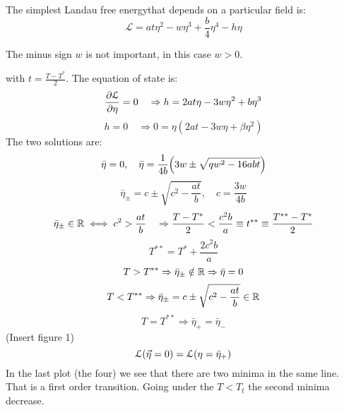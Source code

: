 \documentclass[../main/main.tex]{subfiles}
\begin{document}
The simplest Landau free energythat depends on a particular field is:
\begin{equation}
  \mathcal{L} = a t \eta ^2 - w \eta ^3 + \frac{b}{4} \eta ^4 - h \eta
\end{equation}
\begin{remark}
The minus sign \( w \) is not important, in this case \( w>0 \).
\end{remark}
with \( t = \frac{T-T^*}{2} \).
The equation of state is:
\begin{equation}
  \pdv{\mathcal{L}}{\eta } = 0 \quad \Rightarrow h = 2 a t \eta - 3 w \eta ^2 + b \eta ^3
\end{equation}
\begin{equation}
  h = 0 \quad \Rightarrow 0 = \eta ( 2 a t - 3 w \eta  + \beta \eta ^2)
\end{equation}
The two solutions are:
\begin{equation}
  \bar{\eta } = 0, \quad  \bar{\eta } = \frac{1}{4b} \qty(3w \pm \sqrt{q w^2 - 16 abt} )
\end{equation}
\begin{equation}
  \bar{\eta }_{\pm} = c \pm \sqrt{c^2 - \frac{at}{b}}, \quad c = \frac{3w}{4b}
\end{equation}
\begin{equation}
  \bar{\eta }_{\pm} \in \mathbb{R} \iff c^2 > \frac{at}{b} \quad \Rightarrow \frac{T-T^*}{2} < \frac{c^2 b}{a} \equiv t^{**} \equiv  \frac{T^{**}-T^*}{2}
\end{equation}
\begin{equation}
  T^{**} = T^* + \frac{2c^2b}{a}
\end{equation}
\begin{equation}
  T > T^{**} \Rightarrow \bar{\eta }_{\pm} \notin \mathbb{R} \Rightarrow \bar{\eta } = 0
\end{equation}
\begin{equation}
  T < T^{**} \Rightarrow \bar{\eta }_{\pm} = c \pm \sqrt{c^2 - \frac{at}{b}} \in \mathbb{R}
\end{equation}
\begin{equation}
  T = T^{**} \Rightarrow \bar{\eta }_+ = \bar{\eta }_-
\end{equation}
(Insert figure 1)
\begin{equation}
  \mathcal{L} ( \va{\eta } = 0) = \mathcal{L} (\eta = \bar{\eta }_+ )
\end{equation}
In the last plot (the four) we see that there are two minima in the same line. That is a first order transition. Going under the \( T < T_t \) the second minima decrease.
\end{document}
